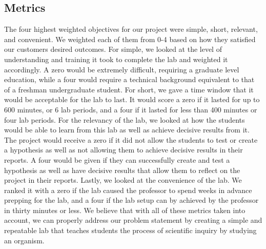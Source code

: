\documentclass{article}
\begin{document}
\subsection{Metrics}
\par The four highest weighted objectives for our project were simple, short, relevant, and convenient. We weighted each of them from 0-4 based on how they satisfied our customers desired outcomes. For simple, we looked at the level of understanding and training it took to complete the lab and weighted it accordingly. A zero would be extremely difficult, requiring a graduate level education, while a four would require a technical background equivalent to that of a freshman undergraduate student. For short, we gave a time window that it would be acceptable for the lab to last. It would score a zero if it lasted for up to 600 minutes, or 6 lab periods, and a four if it lasted for less than 400 minutes or four lab periods. For the relevancy of the lab, we looked at how the students would be able to learn from this lab as well as achieve decisive results from it. The project would receive a zero if it did not allow the students to test or create a hypothesis as well as not allowing them to achieve decisive results in their reports. A four would be given if they can successfully create and test a hypothesis as well as have decisive results that allow them to reflect on the project in their reports. Lastly, we looked at the convenience of the lab. We ranked it with a zero if the lab caused the professor to spend weeks in advance prepping for the lab, and a four if the lab setup can by achieved by the professor in thirty minutes or less. We believe that with all of these metrics taken into account, we can properly address our problem statement by creating a simple and repeatable lab that teaches students the process of scientific inquiry by studying an organism.








\end{document}
